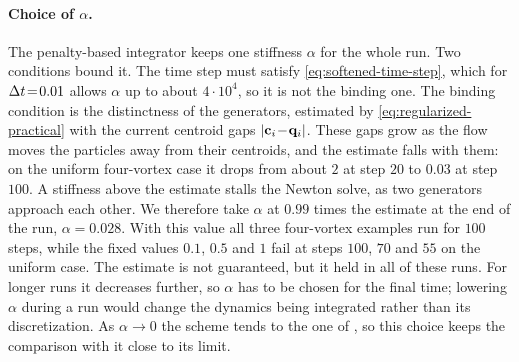 \documentclass[main.tex]{subfiles}
\begin{document}
\paragraph{Choice of $\alpha$.}
The penalty-based integrator keeps one stiffness $\alpha$ for the whole run.
Two conditions bound it.
The time step must satisfy \eqref{eq:softened-time-step}, which for $\Delta t \!=\! 0.01$ allows $\alpha$ up to about $4 \cdot 10^4$, so it is not the binding one.
The binding condition is the distinctness of the generators, estimated by \eqref{eq:regularized-practical} with the current centroid gaps $|\mathbf{c}_i \!-\! \mathbf{q}_i|$.
These gaps grow as the flow moves the particles away from their centroids, and the estimate falls with them: on the uniform four-vortex case it drops from about $2$ at step $20$ to $0.03$ at step $100$.
A stiffness above the estimate stalls the Newton solve, as two generators approach each other.
We therefore take $\alpha$ at $0.99$ times the estimate at the end of the run, $\alpha \!=\! 0.028$.
With this value all three four-vortex examples run for $100$ steps, while the fixed values $0.1$, $0.5$ and $1$ fail at steps $100$, $70$ and $55$ on the uniform case.
The estimate is not guaranteed, but it held in all of these runs.
For longer runs it decreases further, so $\alpha$ has to be chosen for the final time; lowering $\alpha$ during a run would change the dynamics being integrated rather than its discretization.
As $\alpha \!\to\! 0$ the scheme tends to the one of \citet{Gallouet2018Lagrangian}, so this choice keeps the comparison with it close to its limit.

\end{document}
